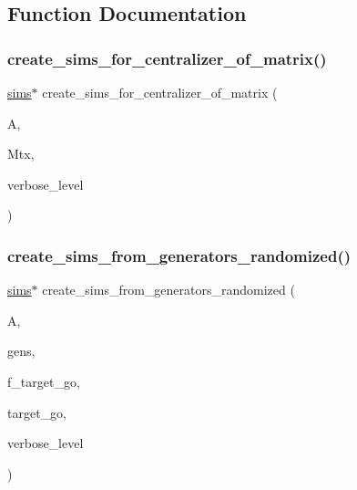 \subsection{Function Documentation}
\mbox{\label{sims__global_8_c_a006a14df436fe3af018855660134d585}} 
\subsubsection{\texorpdfstring{create\+\_\+sims\+\_\+for\+\_\+centralizer\+\_\+of\+\_\+matrix()}{create\_sims\_for\_centralizer\_of\_matrix()}}
{\footnotesize\ttfamily \mbox{\hyperlink{classsims}{sims}}$\ast$ create\+\_\+sims\+\_\+for\+\_\+centralizer\+\_\+of\+\_\+matrix (\begin{DoxyParamCaption}\item[{\mbox{\hyperlink{classaction}{action}} $\ast$}]{A,  }\item[{\mbox{\hyperlink{galois_8h_a09fddde158a3a20bd2dcadb609de11dc}{I\+NT}} $\ast$}]{Mtx,  }\item[{\mbox{\hyperlink{galois_8h_a09fddde158a3a20bd2dcadb609de11dc}{I\+NT}}}]{verbose\+\_\+level }\end{DoxyParamCaption})}

\mbox{\label{sims__global_8_c_a7cd5415a9a6008da180e405ec41a351f}} 
\subsubsection{\texorpdfstring{create\+\_\+sims\+\_\+from\+\_\+generators\+\_\+randomized()}{create\_sims\_from\_generators\_randomized()}}
{\footnotesize\ttfamily \mbox{\hyperlink{classsims}{sims}}$\ast$ create\+\_\+sims\+\_\+from\+\_\+generators\+\_\+randomized (\begin{DoxyParamCaption}\item[{\mbox{\hyperlink{classaction}{action}} $\ast$}]{A,  }\item[{\mbox{\hyperlink{classvector__ge}{vector\+\_\+ge}} $\ast$}]{gens,  }\item[{\mbox{\hyperlink{galois_8h_a09fddde158a3a20bd2dcadb609de11dc}{I\+NT}}}]{f\+\_\+target\+\_\+go,  }\item[{\mbox{\hyperlink{classlonginteger__object}{longinteger\+\_\+object}} \&}]{target\+\_\+go,  }\item[{\mbox{\hyperlink{galois_8h_a09fddde158a3a20bd2dcadb609de11dc}{I\+NT}}}]{verbose\+\_\+level }\end{DoxyParamCaption})}


